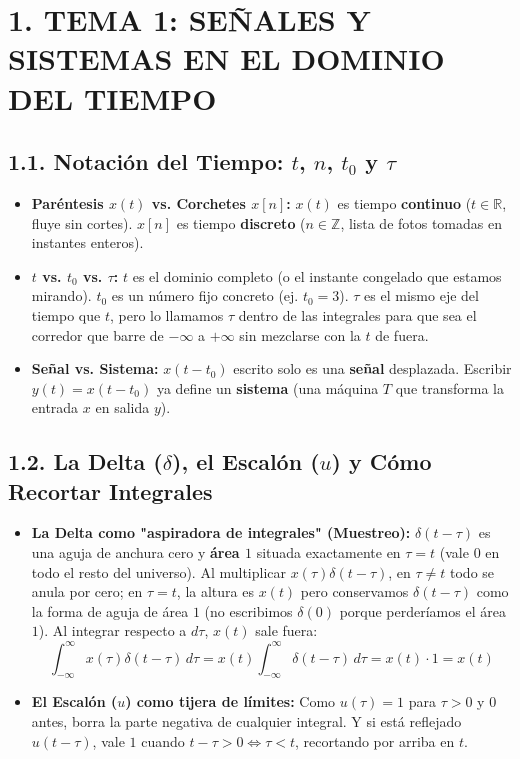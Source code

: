 \documentclass[10pt,a4paper]{article}
\begin{document}
	\section*{1. TEMA 1: SEÑALES Y SISTEMAS EN EL DOMINIO DEL TIEMPO}
	
	\subsection*{1.1. Notación del Tiempo: $t$, $n$, $t_0$ y $\tau$}
	\begin{itemize}
		\item \textbf{Paréntesis $x(t)$ vs. Corchetes $x[n]$:} $x(t)$ es tiempo \textbf{continuo} ($t \in \mathbb{R}$, fluye sin cortes). $x[n]$ es tiempo \textbf{discreto} ($n \in \mathbb{Z}$, lista de fotos tomadas en instantes enteros).
		\item \textbf{$t$ vs. $t_0$ vs. $\tau$:} $t$ es el dominio completo (o el instante congelado que estamos mirando). $t_0$ es un número fijo concreto (ej. $t_0 = 3$). $\tau$ es el mismo eje del tiempo que $t$, pero lo llamamos $\tau$ dentro de las integrales para que sea el corredor que barre de $-\infty$ a $+\infty$ sin mezclarse con la $t$ de fuera.
		\item \textbf{Señal vs. Sistema:} $x(t-t_0)$ escrito solo es una \textbf{señal} desplazada. Escribir $y(t) = x(t-t_0)$ ya define un \textbf{sistema} (una máquina $T$ que transforma la entrada $x$ en salida $y$).
	\end{itemize}
	
	\subsection*{1.2. La Delta ($\delta$), el Escalón ($u$) y Cómo Recortar Integrales}
	\begin{itemize}
		\item \textbf{La Delta como "aspiradora de integrales" (Muestreo):} $\delta(t-\tau)$ es una aguja de anchura cero y \textbf{área $1$} situada exactamente en $\tau = t$ (vale $0$ en todo el resto del universo). Al multiplicar $x(\tau)\delta(t-\tau)$, en $\tau \neq t$ todo se anula por cero; en $\tau = t$, la altura es $x(t)$ pero conservamos $\delta(t-\tau)$ como la forma de aguja de área $1$ (no escribimos $\delta(0)$ porque perderíamos el área $1$). Al integrar respecto a $d\tau$, $x(t)$ sale fuera:
		$$\int_{-\infty}^{\infty} x(\tau)\delta(t-\tau)\,d\tau = x(t)\int_{-\infty}^{\infty} \delta(t-\tau)\,d\tau = x(t) \cdot 1 = x(t)$$
		\item \textbf{El Escalón ($u$) como tijera de límites:} Como $u(\tau) = 1$ para $\tau > 0$ y $0$ antes, borra la parte negativa de cualquier integral. Y si está reflejado $u(t-\tau)$, vale $1$ cuando $t-\tau > 0 \iff \tau < t$, recortando por arriba en $t$.
	\end{itemize}
	
\end{document}
